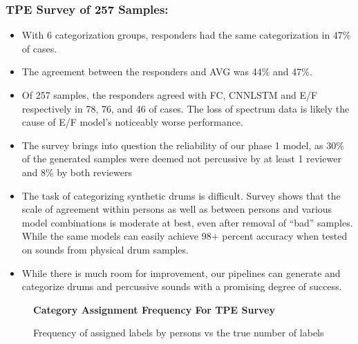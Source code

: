 \documentclass[runningheads,a4paper]{llncs}
\begin{document}
\begin{appendices}
\subsubsection{TPE Survey of 257 Samples:}
\begin{itemize}
    \item With 6 categorization groups, responders had the same categorization in 47\% of cases.
    \item The agreement between the responders and AVG was 44\% and 47\%.
    \item Of 257 samples, the responders agreed with FC, CNNLSTM and E/F respectively in 78, 76, and 46 of cases. The loss of spectrum data is likely the cause of E/F model's noticeably worse performance. 
    \item The survey brings into question the reliability of our phase 1 model, as 30\% of the generated samples were deemed not percussive by at least 1 reviewer and 8\% by both reviewers
    \item The task of categorizing synthetic drums is difficult. Survey shows that the scale of agreement within persons as well as between persons and various model combinations is moderate at best, even after removal of \enquote{bad} samples.  While the same models can easily achieve 98+ percent accuracy when tested on sounds from physical drum samples. 
    \item While there is much room for improvement, our pipelines can generate and categorize drums and percussive sounds with a promising degree of success. 
\end{itemize}

\begin{figure}[h!]
    \begin{center}
    \textbf{Category Assignment Frequency For TPE Survey}
    \end{center}
    \caption{Frequency of assigned labels by persons vs the true number of labels}
\label{fig:freq-survey-2p}
\end{figure}


\end{appendices}
\end{document}
